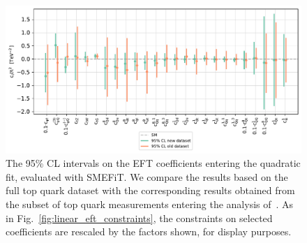 \documentclass[withindex,glossary]{cam-thesis}
\begin{document}
\begin{figure}[tb!]
        \centering
        \includegraphics[scale=0.7]{smeft_plots/smeft_quad_nlo_comparison.pdf}
	\caption{The 95\% CL intervals on the EFT coefficients entering the quadratic fit,
          evaluated with {\sc\small SMEFiT}.
          We compare the results based on the full top quark dataset with
          the corresponding results obtained from the subset of top quark
          measurements entering the analysis of~\cite{Ethier:2021bye}.  
         As in Fig.~\ref{fig:linear_eft_constraints}, the constraints on selected coefficients 
          are rescaled by the factors shown, for display purposes.        
        }
	\label{fig:quadratic_eft_constraints}
\end{figure}
\end{document}

